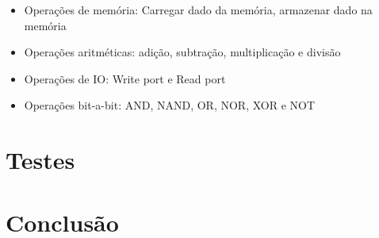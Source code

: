 \documentclass[11pt]{report}
\begin{document}
\begin{itemize}
	\item Operações de memória: Carregar dado da memória, armazenar dado na memória
	\item Operações aritméticas: adição, subtração, multiplicação e divisão
	\item Operações de IO: Write port e Read port
	\item Operações bit-a-bit: AND, NAND, OR, NOR, XOR e NOT
\end{itemize}


\chapter{Testes}

\chapter{Conclusão}
\end{document}

